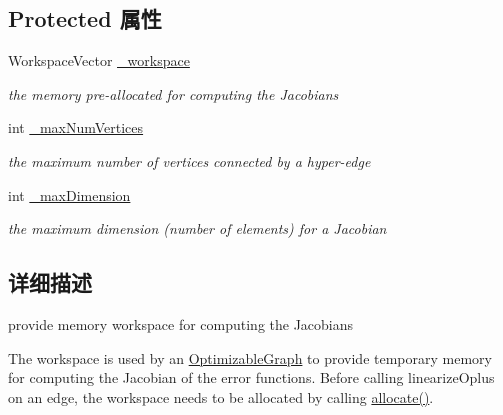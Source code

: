 \subsection*{Protected 属性}
\begin{DoxyCompactItemize}
\item 
\hypertarget{classg2o_1_1JacobianWorkspace_af7dbaa3a651808e1bf3f876896bd1bfc}{Workspace\-Vector \hyperlink{classg2o_1_1JacobianWorkspace_af7dbaa3a651808e1bf3f876896bd1bfc}{\-\_\-workspace}}\label{classg2o_1_1JacobianWorkspace_af7dbaa3a651808e1bf3f876896bd1bfc}

\begin{DoxyCompactList}\small\item\em the memory pre-\/allocated for computing the Jacobians \end{DoxyCompactList}\item 
\hypertarget{classg2o_1_1JacobianWorkspace_a640c84c19a739ce3116fc02c3a66b096}{int \hyperlink{classg2o_1_1JacobianWorkspace_a640c84c19a739ce3116fc02c3a66b096}{\-\_\-max\-Num\-Vertices}}\label{classg2o_1_1JacobianWorkspace_a640c84c19a739ce3116fc02c3a66b096}

\begin{DoxyCompactList}\small\item\em the maximum number of vertices connected by a hyper-\/edge \end{DoxyCompactList}\item 
\hypertarget{classg2o_1_1JacobianWorkspace_aa6cd4fb8bc1bb4fe9ada55d9feefc817}{int \hyperlink{classg2o_1_1JacobianWorkspace_aa6cd4fb8bc1bb4fe9ada55d9feefc817}{\-\_\-max\-Dimension}}\label{classg2o_1_1JacobianWorkspace_aa6cd4fb8bc1bb4fe9ada55d9feefc817}

\begin{DoxyCompactList}\small\item\em the maximum dimension (number of elements) for a Jacobian \end{DoxyCompactList}\end{DoxyCompactItemize}


\subsection{详细描述}
provide memory workspace for computing the Jacobians 

The workspace is used by an \hyperlink{structg2o_1_1OptimizableGraph}{Optimizable\-Graph} to provide temporary memory for computing the Jacobian of the error functions. Before calling linearize\-Oplus on an edge, the workspace needs to be allocated by calling \hyperlink{classg2o_1_1JacobianWorkspace_a8e1d23ced91b721fdb5bd68c8c4e9fc3}{allocate()}. 

